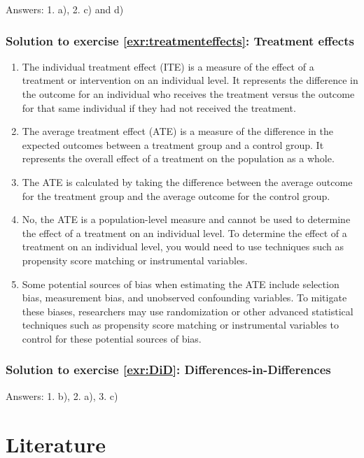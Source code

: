 \documentclass[
  12pt,
  oneside]{book}
\providecommand{\tightlist}{%
  \setlength{\itemsep}{0pt}\setlength{\parskip}{0pt}}
\theoremstyle{definition}
\theoremstyle{definition}
\theoremstyle{definition}
\theoremstyle{definition}
\theoremstyle{remark}
\begin{document}
Answers: 1. a), 2. c) and d)

\hypertarget{sol:treatmenteffects}{%
\subsection*{Solution to exercise \ref{exr:treatmenteffects}: Treatment effects}\label{sol:treatmenteffects}}

\begin{enumerate}
\def\labelenumi{\arabic{enumi}.}
\tightlist
\item
  The individual treatment effect (ITE) is a measure of the effect of a treatment or intervention on an individual level. It represents the difference in the outcome for an individual who receives the treatment versus the outcome for that same individual if they had not received the treatment.
\item
  The average treatment effect (ATE) is a measure of the difference in the expected outcomes between a treatment group and a control group. It represents the overall effect of a treatment on the population as a whole.
\item
  The ATE is calculated by taking the difference between the average outcome for the treatment group and the average outcome for the control group.
\item
  No, the ATE is a population-level measure and cannot be used to determine the effect of a treatment on an individual level. To determine the effect of a treatment on an individual level, you would need to use techniques such as propensity score matching or instrumental variables.
\item
  Some potential sources of bias when estimating the ATE include selection bias, measurement bias, and unobserved confounding variables. To mitigate these biases, researchers may use randomization or other advanced statistical techniques such as propensity score matching or instrumental variables to control for these potential sources of bias.
\end{enumerate}

\hypertarget{sol:DiD}{%
\subsection*{Solution to exercise \ref{exr:DiD}: Differences-in-Differences}\label{sol:DiD}}

Answers: 1. b), 2. a), 3. c)

\hypertarget{literature}{%
\chapter*{Literature}\label{literature}}

  
\end{document}
